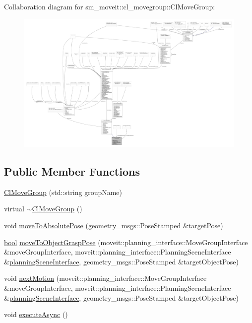 Collaboration diagram for sm\+\_\+moveit\+:\+:cl\+\_\+movegroup\+:\+:Cl\+Move\+Group\+:
\nopagebreak
\begin{figure}[H]
\begin{center}
\leavevmode
\includegraphics[width=350pt]{classsm__moveit_1_1cl__movegroup_1_1ClMoveGroup__coll__graph}
\end{center}
\end{figure}
\subsection*{Public Member Functions}
\begin{DoxyCompactItemize}
\item 
\hyperlink{classsm__moveit_1_1cl__movegroup_1_1ClMoveGroup_a996b92fda56d04827995d6a012430f36}{Cl\+Move\+Group} (std\+::string group\+Name)
\item 
virtual \hyperlink{classsm__moveit_1_1cl__movegroup_1_1ClMoveGroup_a8cf4cd423cc40c8c1a735450a165f2c4}{$\sim$\+Cl\+Move\+Group} ()
\item 
void \hyperlink{classsm__moveit_1_1cl__movegroup_1_1ClMoveGroup_a6b85fe06800db92b08346603e5d2eabb}{move\+To\+Absolute\+Pose} (geometry\+\_\+msgs\+::\+Pose\+Stamped \&target\+Pose)
\item 
\hyperlink{classbool}{bool} \hyperlink{classsm__moveit_1_1cl__movegroup_1_1ClMoveGroup_a1a07b4b059a230547ae7c243cac191ee}{move\+To\+Object\+Grasp\+Pose} (moveit\+::planning\+\_\+interface\+::\+Move\+Group\+Interface \&move\+Group\+Interface, moveit\+::planning\+\_\+interface\+::\+Planning\+Scene\+Interface \&\hyperlink{classsm__moveit_1_1cl__movegroup_1_1ClMoveGroup_a26b5c9e0aef1cd67ee977a756b69cf76}{planning\+Scene\+Interface}, geometry\+\_\+msgs\+::\+Pose\+Stamped \&target\+Object\+Pose)
\item 
void \hyperlink{classsm__moveit_1_1cl__movegroup_1_1ClMoveGroup_a83572f4367cc38293c79d2fc0d7d6725}{next\+Motion} (moveit\+::planning\+\_\+interface\+::\+Move\+Group\+Interface \&move\+Group\+Interface, moveit\+::planning\+\_\+interface\+::\+Planning\+Scene\+Interface \&\hyperlink{classsm__moveit_1_1cl__movegroup_1_1ClMoveGroup_a26b5c9e0aef1cd67ee977a756b69cf76}{planning\+Scene\+Interface}, geometry\+\_\+msgs\+::\+Pose\+Stamped \&target\+Object\+Pose)
\item 
void \hyperlink{classsm__moveit_1_1cl__movegroup_1_1ClMoveGroup_a1d72a970317fbd0aefb02fb777a5388e}{execute\+Async} ()
\end{DoxyCompactItemize}
